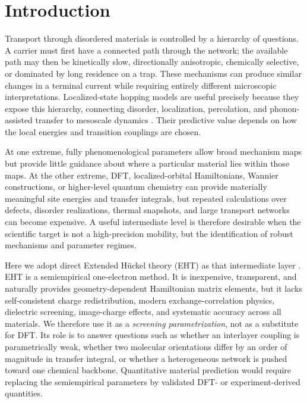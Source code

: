 \documentclass[aps,prmaterials,reprint,amsmath,amssymb,superscriptaddress,longbibliography]{revtex4-2}
\begin{document}
\section{Introduction}
Transport through disordered materials is controlled by a hierarchy of questions. A carrier must first have a connected path through the network; the available path may then be kinetically slow, directionally anisotropic, chemically selective, or dominated by long residence on a trap. These mechanisms can produce similar changes in a terminal current while requiring entirely different microscopic interpretations. Localized-state hopping models are useful precisely because they expose this hierarchy, connecting disorder, localization, percolation, and phonon-assisted transfer to mesoscale dynamics \cite{anderson1958,miller1960,ambegaokar1971,mott1979,shklovskii1984,abrahams1979,kramer1993}. Their predictive value depends on how the local energies and transition couplings are chosen.

At one extreme, fully phenomenological parameters allow broad mechanism maps but provide little guidance about where a particular material lies within those maps. At the other extreme, DFT, localized-orbital Hamiltonians, Wannier constructions, or higher-level quantum chemistry can provide materially meaningful site energies and transfer integrals, but repeated calculations over defects, disorder realizations, thermal snapshots, and large transport networks can become expensive. A useful intermediate level is therefore desirable when the scientific target is not a high-precision mobility, but the identification of robust mechanisms and parameter regimes.

Here we adopt direct Extended H\"uckel theory (EHT) as that intermediate layer \cite{slater1954,wolfsberg1952,hoffmann1963}. EHT is a semiempirical one-electron method. It is inexpensive, transparent, and naturally provides geometry-dependent Hamiltonian matrix elements, but it lacks self-consistent charge redistribution, modern exchange-correlation physics, dielectric screening, image-charge effects, and systematic accuracy across all materials. We therefore use it as a \emph{screening parametrization}, not as a substitute for DFT. Its role is to answer questions such as whether an interlayer coupling is parametrically weak, whether two molecular orientations differ by an order of magnitude in transfer integral, or whether a heterogeneous network is pushed toward one chemical backbone. Quantitative material prediction would require replacing the semiempirical parameters by validated DFT- or experiment-derived quantities.
\end{document}
